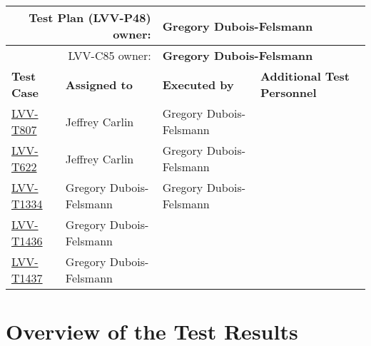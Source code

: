 \documentclass[DM,lsstdraft,STR,toc]{lsstdoc}
\begin{document}
\begin{longtable}{p{3cm}p{3cm}p{3cm}p{6cm}}
\hline
\multicolumn{2}{r}{Test Plan (LVV-P48) owner:} &
\multicolumn{2}{l}{\textbf{ Gregory Dubois-Felsmann } }\\\hline
\multicolumn{2}{r}{ LVV-C85 owner:} &
\multicolumn{2}{l}{\textbf{
    Gregory Dubois-Felsmann
}
} \\\hline
\textbf{Test Case} & \textbf{Assigned to} & \textbf{Executed by} & \textbf{Additional Test Personnel} \\ \hline
\href{https://jira.lsstcorp.org/secure/Tests.jspa#/testCase/LVV-T807}{LVV-T807}
& {\small Jeffrey Carlin } & {\small Gregory Dubois-Felsmann } &
\begin{minipage}[]{6cm}
\smallskip
{\small  }
\medskip
\end{minipage}
\\ \hline
\href{https://jira.lsstcorp.org/secure/Tests.jspa#/testCase/LVV-T622}{LVV-T622}
& {\small Jeffrey Carlin } & {\small Gregory Dubois-Felsmann } &
\begin{minipage}[]{6cm}
\smallskip
{\small  }
\medskip
\end{minipage}
\\ \hline
\href{https://jira.lsstcorp.org/secure/Tests.jspa#/testCase/LVV-T1334}{LVV-T1334}
& {\small Gregory Dubois-Felsmann } & {\small Gregory Dubois-Felsmann } &
\begin{minipage}[]{6cm}
\smallskip
{\small  }
\medskip
\end{minipage}
\\ \hline
\href{https://jira.lsstcorp.org/secure/Tests.jspa#/testCase/LVV-T1436}{LVV-T1436}
& {\small Gregory Dubois-Felsmann } & {\small  } &
\begin{minipage}[]{6cm}
\smallskip
{\small  }
\medskip
\end{minipage}
\\ \hline
\href{https://jira.lsstcorp.org/secure/Tests.jspa#/testCase/LVV-T1437}{LVV-T1437}
& {\small Gregory Dubois-Felsmann } & {\small  } &
\begin{minipage}[]{6cm}
\smallskip
{\small  }
\medskip
\end{minipage}
\\ \hline
\end{longtable}

\newpage

\section{Overview of the Test Results}
\label{sect:overview}
\end{document}

